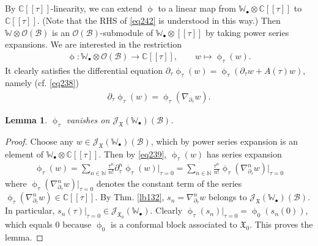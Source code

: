 \documentclass[11pt,b5paper,notitlepage]{article}
\theoremstyle{definition}
\theoremstyle{plain}
\newtheorem{lm}[df]{Lemma}
\newcommand{\fk}{\mathfrak}
\newcommand{\mc}{\mathcal}
\newcommand{\scr}{\mathscr}
\newcommand{\blt}{\bullet}
\newcommand{\Wbb}{\mathbb W}
\newcommand{\Cbb}{\mathbb C}
\newcommand{\Nbb}{\mathbb N}
\numberwithin{equation}{section}
\begin{document}
\subsection{}

By $\Cbb[[\tau]]$-linearity, we can extend $\upphi$ to a linear map from $\Wbb_\blt\otimes\Cbb[[\tau]]$ to $\Cbb[[\tau]]$. (Note that the RHS of \eqref{eq242} is understood in this way.) Then $\Wbb\otimes\scr O(\mc B)$ is an $\scr O(\mc B)$-submodule of $\Wbb_\blt\otimes[[\tau]]$ by taking power series expansions. We are interested in the restriction
\begin{align*}
\upphi:\Wbb_\blt\otimes\scr O(\mc B)\rightarrow\Cbb[[\tau]],\qquad w\mapsto \upphi_\tau(w).
\end{align*}
It clearly satisfies the differential equation $\partial_\tau\upphi_\tau(w)=\upphi_\tau (\partial_\tau w+A(\tau)w)$, namely (cf. \eqref{eq238})
\begin{align}
\partial_\tau\upphi_\tau(w)=\upphi_\tau(\nabla_{\partial_\tau} w).\label{eq239}
\end{align}

\begin{lm}\label{lb140}
$\upphi_\tau$ vanishes on $\scr J_{\fk X}(\Wbb_\blt)(\mc B)$.
\end{lm}


\begin{proof}
Choose any $w\in \scr J_{\fk X}(\Wbb_\blt)(\mc B)$, which by power series expansion is an element of $\Wbb_\blt\otimes\Cbb[[\tau]]$. Then by \eqref{eq239}, $\upphi_\tau(w)$ has series expansion
\begin{align*}
\upphi_\tau(w)=\sum_{n\in\Nbb}\frac {\tau^n}{n!}\partial^n_\tau\upphi_\tau(w)\big|_{\tau=0}=\sum_{n\in\Nbb}\frac {\tau^n}{n!}\upphi_\tau(\nabla^n_{\partial_\tau} w)\big|_{\tau=0}
\end{align*}
where $\upphi_\tau(\nabla^n_{\partial_\tau} w)\big|_{\tau=0}$ denotes the constant term of the series $\upphi_\tau(\nabla^n_{\partial_\tau} w)\in\Cbb[[\tau]]$. By Thm. \ref{lb132},  $s_n=\nabla^n_{\partial_\tau}w$ belongs to $\scr J_{\fk X}(\Wbb_\blt)(\mc B)$. In particular, $s_n(\tau)|_{\tau=0}\in\scr J_{\fk X_0}(\Wbb_\blt)$. Clearly $\upphi_\tau(s_n)|_{\tau=0}=\upphi_0(s_n(0))$, which equals $0$ because $\upphi_0$ is a conformal block associated to $\fk X_0$. This proves the lemma.
\end{proof}



\subsection{}
\end{document}
